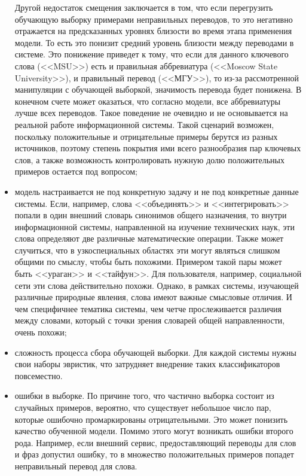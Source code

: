 \begin{itemize}
Другой недостаток смещения заключается в том, что если перегрузить обучающую выборку примерами неправильных переводов, то это негативно отражается на предсказанных уровнях близости во время этапа применения модели. То есть это понизит средний уровень близости между переводами в системе. Это понижение приведет к тому, что если для данного ключевого слова (<<MSU>>) есть и правильная аббревиатура (<<Moscow State University>>), и правильный перевод (<<МГУ>>), то из-за рассмотренной манипуляции с обучающей выборкой, значимость перевода будет понижена. В конечном счете может оказаться, что согласно модели, все аббревиатуры лучше всех переводов. Такое поведение не очевидно и не основывается на реальной работе информационной системы. Такой сценарий возможен, поскольку положительные и отрицательные примеры берутся из разных источников, поэтому степень покрытия ими всего разнообразия пар ключевых слов, а также возможность контролировать нужную долю положительных примеров остается под вопросом;
    \item модель настраивается не под конкретную задачу и не под конкретные данные системы. Если, например, слова <<объединять>> и <<интегрировать>> попали в один внешний словарь синонимов общего назначения, то внутри информационной системы, направленной на изучение технических наук, эти слова определяют две различные математические операции. Также может случиться, что в узкоспециальных областях эти могут являться слишком общими по смыслу, чтобы быть похожими. Примером такой пары может быть <<ураган>> и <<тайфун>>. Для пользователя, например, социальной сети эти слова действительно похожи. Однако, в рамках системы, изучающей различные природные явления, слова имеют важные смысловые отличия. И чем специфичнее тематика системы, чем четче прослеживается различия между словами, который с точки зрения словарей общей направленности, очень похожи;
    \item сложность процесса сбора обучающей выборки. Для каждой системы нужны свои наборы эвристик, что затрудняет внедрение таких классификаторов повсеместно.
    \item ошибки в выборке. По причине того, что частично выборка состоит из случайных примеров, вероятно, что существует небольшое число пар, которые ошибочно промаркированы отрицательными. Это может понизить качество обученной модели. Помимо этого могут возникать ошибки второго рода. Например, если внешний сервис, предоставляющий переводы для слов и фраз допустил ошибку, то в множество положительных примеров попадет неправильный перевод для слова.
\end{itemize}

